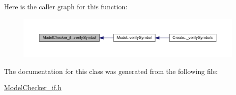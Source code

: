 Here is the caller graph for this function\-:\nopagebreak
\begin{figure}[H]
\begin{center}
\leavevmode
\includegraphics[width=350pt]{class_model_checker__if_a36eada12fe9753f5c89099c572e27426_icgraph}
\end{center}
\end{figure}




The documentation for this class was generated from the following file\-:\begin{DoxyCompactItemize}
\item 
\hyperlink{_model_checker__if_8h}{Model\-Checker\-\_\-if.\-h}\end{DoxyCompactItemize}
